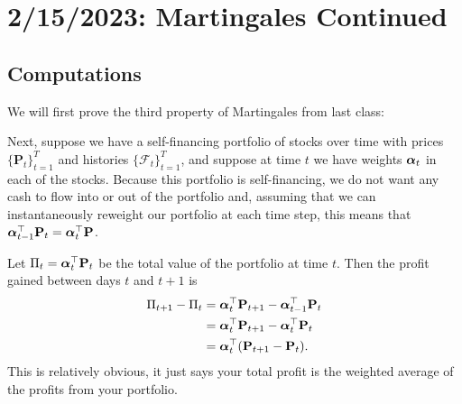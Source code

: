 \chapter{2/15/2023: Martingales Continued}
\section{Computations}
We will first prove the third property of Martingales from last class:

Next, suppose we have a self-financing portfolio of stocks over time with prices $\{\mathbf P_t\}_{t=1}^T$ and histories $\{\mathcal F_t\}_{t=1}^T$, and suppose at time $t$ we have weights $\boldsymbol{\alpha}_t$ in each of the stocks. Because this portfolio is self-financing, we do not want any cash to flow into or out of the portfolio and, assuming that we can instantaneously reweight our portfolio at each time step, this means that $\boldsymbol{\alpha}_{t-1}^\top\mathbf P_t = \boldsymbol{\alpha}_t^\top\mathbf P$.

Let $\Pi_t=\boldsymbol{\alpha}_t^\top\mathbf P_t$ be the total value of the portfolio at time $t$. Then the profit gained between days $t$ and $t+1$ is \begin{align*}
	\Pi_{t+1}-\Pi_t &= \boldsymbol{\alpha}_t^\top\mathbf P_{t+1} - \boldsymbol{\alpha}_{t-1}^\top\mathbf P_t \\
					&= \boldsymbol{\alpha}_t^\top\mathbf P_{t+1} - \boldsymbol{\alpha}_t^\top\mathbf P_t \\
					&= \boldsymbol{\alpha}_t^\top(\mathbf P_{t+1}-\mathbf P_t).
\end{align*} This is relatively obvious, it just says your total profit is the weighted average of the profits from your portfolio.

